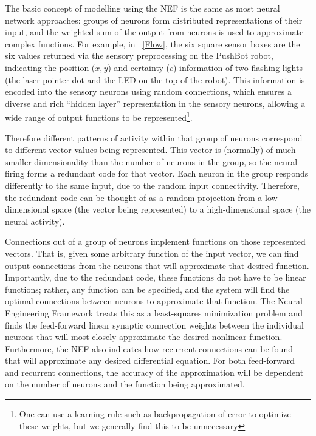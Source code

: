 \documentclass[conference]{IEEEtran}
\begin{document}
The basic concept of modelling using the NEF is the same as most neural network
approaches: groups of neurons form distributed representations of their input,
and the weighted sum of the output from neurons is used to approximate
complex functions.  For example, in \figurename~\ref{Flow}, the six square
sensor boxes are the six values returned via the sensory preprocessing on the
PushBot robot, indicating the position ($x, y$) and certainty ($c$) information 
of two flashing lights (the laser pointer dot and the LED on the top of the
robot).  This information is encoded into the sensory neurons using random
connections, which ensures a diverse and rich ``hidden layer''
representation in the sensory neurons, allowing a wide range of output
functions to be represented\footnote{One can use a
learning rule such as backpropagation of error to optimize these weights,
but we generally find this to be unnecessary}.

Therefore different patterns of activity within
that group of neurons correspond to different vector values being represented.
This vector is (normally) of much smaller dimensionality than the number of 
neurons in the group, so the neural firing forms a redundant code for that 
vector. Each neuron in the group responds differently to the same input, due
to the random input connectivity. Therefore, the redundant code can be thought of as a 
random projection from a low-dimensional space (the vector being represented) 
to a high-dimensional space (the neural activity). 

Connections out of a group of neurons implement functions on those represented 
vectors. That is, given some arbitrary function of the input vector, we can
find output connections from the neurons that will approximate that desired
function.  Importantly, due to 
the redundant code, these functions do not have to be linear functions; 
rather, any function can be specified, and the system will find the optimal
connections between neurons to approximate that function. The Neural Engineering 
Framework treats this as a least-squares minimization problem and finds the 
feed-forward linear synaptic connection weights between the individual neurons that will 
most closely approximate the desired nonlinear function. Furthermore, the NEF 
also indicates how recurrent connections can be found that will approximate 
any desired differential equation.  For both feed-forward and recurrent 
connections, the accuracy of the approximation will be dependent on the 
number of neurons and the function being approximated. 
\end{document}
